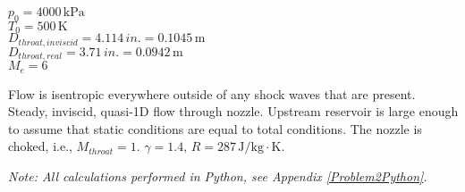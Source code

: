\documentclass[../main.tex]{subfiles}
\begin{document}

\givens{}

\(p_0=4000\,\unit{\kilo\pascal}\)\\
\(T_0 = 500\,\unit{\kelvin}\)\\
\(D_{throat, inviscid} = 4.114\,\unit{in.} = 0.1045\,\unit{\meter}\)\\
\(D_{throat, real} = 3.71\,\unit{in.} = 0.0942\,\unit{\meter}\)\\
\(M_e=6\)

\assumptions{}
Flow is isentropic everywhere outside of any shock waves that are present.
Steady, inviscid, quasi-1D flow through nozzle. 
Upstream reservoir is large enough to assume that static conditions are equal to total conditions. 
The nozzle is choked, i.e., \(M_{throat}=1\).
\(\gamma=1.4,\,R=287\,\unit{\joule/\kilogram\cdot\kelvin}\).

\textit{Note: All calculations performed in Python, see Appendix \ref{Problem2Python}.}
\end{document}

